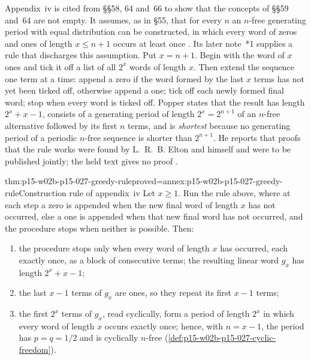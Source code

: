 Appendix~iv is cited from \S\S58, 64 and~66 to show that the concepts of
\S\S59 and~64 are not empty. It assumes, as in \S55, that for every
\(n\) an \(n\)-free generating period with equal distribution can be
constructed, in which every word of zeros and ones of length
\(x\leq n+1\) occurs at least once
\parencite[appendix~iv, p.~293]{Popper2002LogicDiscoveryUI}. Its later
note~*1 supplies a rule that discharges this assumption. Put \(x=n+1\).
Begin with the word of \(x\) ones and tick it off a list of all \(2^x\)
words of length \(x\). Then extend the sequence one term at a time:
append a zero if the word formed by the last \(x\) terms has not yet been
ticked off, otherwise append a one; tick off each newly formed final word;
stop when every word is ticked off. Popper states that the result has
length \(2^x+x-1\), consists of a generating period of length
\(2^x=2^{n+1}\) of an \(n\)-free alternative followed by its first \(n\)
terms, and is \emph{shortest} because no generating period of a periodic
\(n\)-free sequence is shorter than \(2^{n+1}\). He reports that proofs
that the rule works were found by L.~R.~B. Elton and himself and were to
be published jointly; the held text gives no proof
\parencite[appendix~iv, note~*1, pp.~293--294]{Popper2002LogicDiscoveryUI}.

\begin{hbtheorem}{thm:p15-w02b-p15-027-greedy-rule}{proved=annex:p15-w02b-p15-027-greedy-rule}{Construction rule of appendix~iv}
Let \(x\geq1\). Run the rule above, where at each step a zero is appended
when the new final word of length \(x\) has not occurred, else a one is
appended when that new final word has not occurred, and the procedure
stops when neither is possible. Then:
\begin{enumerate}
\item the procedure stops only when every word of length \(x\) has
  occurred, each exactly once, as a block of consecutive terms; the
  resulting linear word \(g_x\) has length \(2^x+x-1\);
\item the last \(x-1\) terms of \(g_x\) are ones, so they repeat its
  first \(x-1\) terms;
\item the first \(2^x\) terms of \(g_x\), read cyclically, form a period
  of length \(2^x\) in which every word of length \(x\) occurs exactly
  once; hence, with \(n=x-1\), the period has \(p=q=1/2\) and is
  cyclically \(n\)-free (\cref{def:p15-w02b-p15-027-cyclic-freedom}).
\end{enumerate}
\end{hbtheorem}

